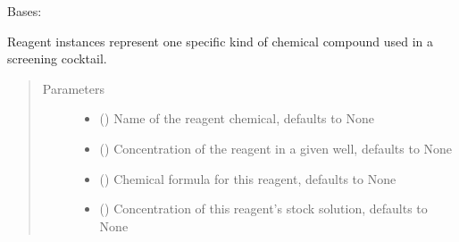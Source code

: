\documentclass[letterpaper,10pt,english]{sphinxmanual}
\begin{document}
\begin{fulllineitems}
\label{\detokenize{polo.crystallography:polo.crystallography.cocktail.Reagent}}
Bases: 

Reagent instances represent one specific kind of chemical compound
used in a screening cocktail.
\begin{quote}\begin{description}
\item[{Parameters}] \leavevmode\begin{itemize}
\item {} 
 (\sphinxstyleliteralemphasis{\sphinxupquote{, }}) \textendash{} Name of the reagent chemical,
defaults to None

\item {} 
 ({\hyperref[\detokenize{polo.crystallography:polo.crystallography.cocktail.SignedValue}]{}}\sphinxstyleliteralemphasis{\sphinxupquote{, }}) \textendash{} Concentration of the reagent in a given well,
defaults to None

\item {} 
 (\sphinxstyleliteralemphasis{\sphinxupquote{, }}) \textendash{} Chemical formula for this reagent, defaults
to None

\item {} 
 ({\hyperref[\detokenize{polo.crystallography:polo.crystallography.cocktail.SignedValue}]{}}\sphinxstyleliteralemphasis{\sphinxupquote{, }}) \textendash{} Concentration of this reagent’s stock solution,
defaults to None


\end{itemize}
\end{description}
\end{quote}
\end{fulllineitems}
\end{document}
